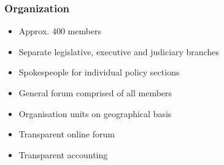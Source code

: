 \begin{frame}
	\frametitle{Organization}
	\begin{itemize}
		\item Approx. 400 members
		\item Separate legislative, executive and judiciary branches
		\item Spokespeople for individual policy sections
		\item General forum comprised of all members
		\item Organisation units on geographical basis
		\item Transparent online forum
		\item Transparent accounting
	\end{itemize}
	
	

\end{frame}

